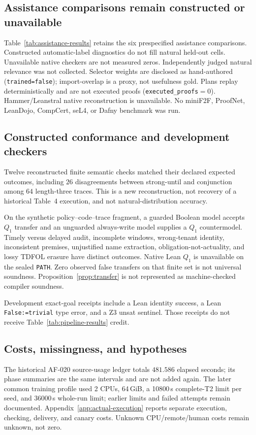 \documentclass{article}
\begin{document}
\subsection{Assistance comparisons remain constructed or unavailable}
Table~\ref{tab:assistance-results} retains the six prespecified assistance comparisons. Constructed automatic-label diagnostics do not fill natural held-out cells. Unavailable native checkers are not measured zeros. Independently judged natural relevance was not collected. Selector weights are disclosed as hand-authored (\texttt{trained=false}); import-overlap is a proxy, not usefulness gold. Plans replay deterministically and are not executed proofs (\texttt{executed\_proofs}$=0$). Hammer/Leanstral native reconstruction is unavailable. No miniF2F, ProofNet, LeanDojo, CompCert, seL4, or Dafny benchmark was run.



\subsection{Constructed conformance and development checkers}
Twelve reconstructed finite semantic checks matched their declared expected outcomes, including $26$ disagreements between strong-until and conjunction among $64$ length-three traces. This is a new reconstruction, not recovery of a historical Table~4 execution, and not natural-distribution accuracy.

On the synthetic policy--code--trace fragment, a guarded Boolean model accepts $Q_1$ transfer and an unguarded always-write model supplies a $Q_1$ countermodel. Timely versus delayed audit, incomplete windows, wrong-tenant identity, inconsistent premises, unjustified name extraction, obligation-not-actuality, and lossy TDFOL erasure have distinct outcomes. Native Lean $Q_1$ is unavailable on the sealed \texttt{PATH}. Zero observed false transfers on that finite set is not universal soundness. Proposition~\ref{prop:transfer} is not represented as machine-checked compiler soundness.

Development exact-goal receipts include a Lean identity success, a Lean \texttt{False:=trivial} type error, and a Z3 unsat sentinel. Those receipts do not receive Table~\ref{tab:pipeline-results} credit.

\subsection{Costs, missingness, and hypotheses}
The historical AF-020 source-usage ledger totals $481.586$ elapsed seconds; its phase summaries are the same intervals and are not added again. The later common training profile used 2 CPUs, 64\,GiB, a 10800\,s complete-T2 limit per seed, and 36000\,s whole-run limit; earlier limits and failed attempts remain documented. Appendix~\ref{app:actual-execution} reports separate execution, checking, delivery, and canary costs. Unknown CPU/remote/human costs remain unknown, not zero.
\end{document}
